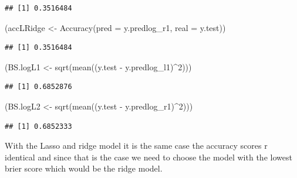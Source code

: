 \documentclass[
]{article}
\newenvironment{Shaded}{\begin{snugshade}}{\end{snugshade}}
\newcommand{\AttributeTok}[1]{\textcolor[rgb]{0.77,0.63,0.00}{#1}}
\newcommand{\CommentTok}[1]{\textcolor[rgb]{0.56,0.35,0.01}{\textit{#1}}}
\newcommand{\DecValTok}[1]{\textcolor[rgb]{0.00,0.00,0.81}{#1}}
\newcommand{\FunctionTok}[1]{\textcolor[rgb]{0.00,0.00,0.00}{#1}}
\newcommand{\NormalTok}[1]{#1}
\newcommand{\OtherTok}[1]{\textcolor[rgb]{0.56,0.35,0.01}{#1}}
\newcommand{\SpecialCharTok}[1]{\textcolor[rgb]{0.00,0.00,0.00}{#1}}
\begin{document}
\begin{verbatim}
## [1] 0.3516484
\end{verbatim}

\begin{Shaded}
\begin{Highlighting}[]
\NormalTok{(accLRidge }\OtherTok{\textless{}{-}} \FunctionTok{Accuracy}\NormalTok{(}\AttributeTok{pred =}\NormalTok{ y.predlog\_r1, }\AttributeTok{real =}\NormalTok{ y.test))}
\end{Highlighting}
\end{Shaded}

\begin{verbatim}
## [1] 0.3516484
\end{verbatim}

\begin{Shaded}
\begin{Highlighting}[]
\NormalTok{(BS.logL1 }\OtherTok{\textless{}{-}} \FunctionTok{sqrt}\NormalTok{(}\FunctionTok{mean}\NormalTok{((y.test }\SpecialCharTok{{-}}\NormalTok{ y.predlog\_l1)}\SpecialCharTok{\^{}}\DecValTok{2}\NormalTok{)))}
\end{Highlighting}
\end{Shaded}

\begin{verbatim}
## [1] 0.6852876
\end{verbatim}

\begin{Shaded}
\begin{Highlighting}[]
\NormalTok{(BS.logL2 }\OtherTok{\textless{}{-}} \FunctionTok{sqrt}\NormalTok{(}\FunctionTok{mean}\NormalTok{((y.test }\SpecialCharTok{{-}}\NormalTok{ y.predlog\_r1)}\SpecialCharTok{\^{}}\DecValTok{2}\NormalTok{)))}
\end{Highlighting}
\end{Shaded}

\begin{verbatim}
## [1] 0.6852333
\end{verbatim}

With the Lasso and ridge model it is the same case the accuracy scores r
identical and since that is the case we need to choose the model with
the lowest brier score which would be the ridge model.

\begin{Shaded}
\end{Shaded}
\end{document}
